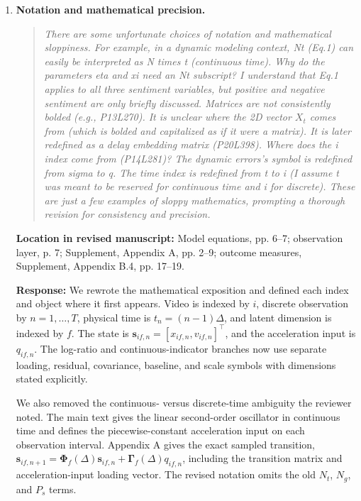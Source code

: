 \documentclass[11pt]{article}
\newenvironment{reviewquote}{\begin{quote}\small\itshape}{\end{quote}}
\newcommand{\point}[1]{\textbf{#1.}}
\newcommand{\location}[1]{\textbf{Location in revised manuscript:} #1\par}
\newcommand{\response}{\textbf{Response:} }
\begin{document}
\begin{enumerate}
  \item \point{Notation and mathematical precision}
  \begin{reviewquote}
  There are some unfortunate choices of notation and mathematical sloppiness. For example, in a dynamic modeling context, Nt (Eq.1) can easily be interpreted as N times t (continuous time). Why do the parameters eta and xi need an Nt subscript? I understand that Eq.1 applies to all three sentiment variables, but positive and negative sentiment are only briefly discussed. Matrices are not consistently bolded (e.g., P13L270). It is unclear where the 2D vector \(X_t\) comes from (which is bolded and capitalized as if it were a matrix). It is later redefined as a delay embedding matrix (P20L398). Where does the i index come from (P14L281)? The dynamic errors's symbol is redefined from sigma to q. The time index is redefined from t to i (I assume t was meant to be reserved for continuous time and i for discrete). These are just a few examples of sloppy mathematics, prompting a thorough revision for consistency and precision.
  \end{reviewquote}
  \location{Model equations, pp. 6--7; observation layer, p. 7; Supplement, Appendix A, pp. 2--9; outcome measures, Supplement, Appendix B.4, pp. 17--19.}
  \response We rewrote the mathematical exposition and defined each index and object where it first appears. Video is indexed by \(i\), discrete observation by \(n=1,\ldots,T\), physical time is \(t_n=(n-1)\Delta\), and latent dimension is indexed by \(f\). The state is \(\mathbf{s}_{if,n}=[x_{if,n},v_{if,n}]^\top\), and the acceleration input is \(q_{if,n}\). The log-ratio and continuous-indicator branches now use separate loading, residual, covariance, baseline, and scale symbols with dimensions stated explicitly.

  We also removed the continuous- versus discrete-time ambiguity the reviewer noted. The main text gives the linear second-order oscillator in continuous time and defines the piecewise-constant acceleration input on each observation interval. Appendix A gives the exact sampled transition, \(\mathbf{s}_{if,n+1}=\boldsymbol{\Phi}_f(\Delta)\mathbf{s}_{if,n}+\boldsymbol{\Gamma}_f(\Delta)q_{if,n}\), including the transition matrix and acceleration-input loading vector. The revised notation omits the old \(N_t\), \(N_g\), and \(P_s\) terms.


\end{enumerate}
\end{document}
